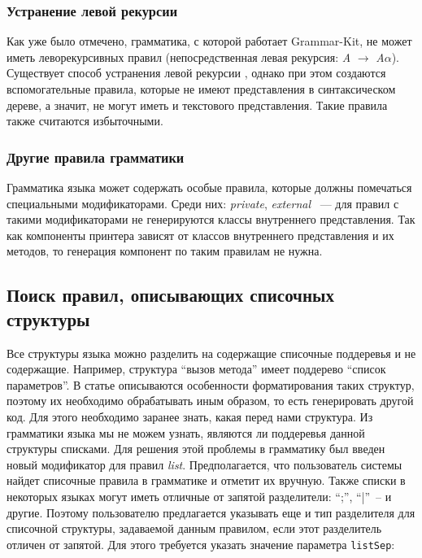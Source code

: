 \subsubsection{Устранение левой рекурсии}
Как уже было отмечено, грамматика, с которой работает Grammar-Kit, не может иметь леворекурсивных правил (непосредственная левая рекурсия: \emph{A} $\rightarrow$ \emph{A}$\alpha$).
Существует способ устранения левой рекурсии \cite{book:ulman}, однако при этом создаются вспомогательные правила, которые не имеют представления в синтаксическом дереве, а значит, не могут иметь и текстового представления.
Такие правила также считаются избыточными.

\subsubsection{Другие правила грамматики}
Грамматика языка может содержать особые правила, которые должны помечаться специальными модификаторами.
Среди них: \emph{private}, \emph{external} ~--- для правил с такими модификаторами не генерируются классы внутреннего представления.
Так как компоненты принтера зависят от классов внутреннего представления и их методов, то генерация компонент по таким правилам не нужна.

\subsection{Поиск правил, описывающих списочных структуры}
Все структуры языка можно разделить на содержащие списочные поддеревья и не содержащие.
Например, структура ``вызов метода'' имеет поддерево ``список параметров''.
В статье \cite{paper:while} описываются особенности форматирования таких структур, поэтому их необходимо обрабатывать иным образом, то есть генерировать другой код.
Для этого необходимо заранее знать, какая перед нами структура.
Из грамматики языка мы не можем узнать, являются ли поддеревья данной структуры списками.
Для решения этой проблемы в грамматику был введен новый модификатор для правил \emph{list}.
Предполагается, что пользователь системы найдет списочные правила в грамматике и отметит их вручную.
Также списки в некоторых языках могут иметь отличные от запятой разделители: ``;'', ``|''~-- и другие.
Поэтому пользователю предлагается указывать еще и тип разделителя для списочной структуры, задаваемой данным правилом, если этот разделитель отличен от запятой.
Для этого требуется указать значение параметра \lstinline{listSep}:

